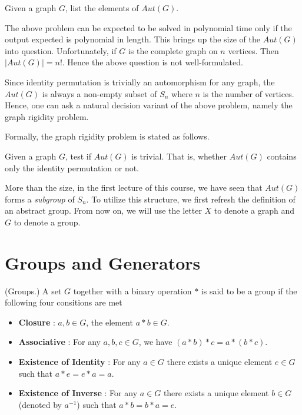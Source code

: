 \begin{problem}
Given a graph $G$, list the elements of $Aut(G)$.
\end{problem}

The above problem can be expected to be solved in polynomial time only if the output expected is polynomial in length. This brings up the size of the $Aut(G)$ into question. Unfortunately, if $G$ is the complete graph on $n$ vertices. Then $|Aut(G)|=n!$. Hence the above question is not well-formulated.

Since identity permutation is trivially an automorphism for any graph, the $Aut(G)$ is always a non-empty subset of $S_n$ where $n$ is the number of vertices. Hence, one can ask a natural decision variant of the above problem, namely the graph rigidity problem.

Formally, the graph rigidity problem is stated as follows.
\begin{problem}
Given a graph $G$, test if $Aut(G)$ is trivial. That is, whether $Aut(G)$ contains only the identity permutation or not.
\end{problem}

More than the size, in the first lecture of this course, we have seen that $Aut(G)$ forms a \textit{subgroup} of $S_n$. To utilize this structure, we first refresh the definition of an abstract group. From now on, we will use the letter $X$ to denote a graph and $G$ to denote a group. 


\section{Groups and Generators}

\begin{definition}(Groups.)
A set $G$ together with a binary operation $*$ is said to be a group if the following four consitions are met
\begin{itemize}
\item \textbf{Closure} : $a,b\in G$, the element $a*b\in G$.
\item \textbf{Associative} : For any $a,b,c\in G$, we have $(a*b)*c = a*(b*c)$.
\item \textbf{Existence of Identity} : For any $a\in G$ there exists a unique element $e\in G$ such that $a*e =e*a =a$. 
\item \textbf{Existence of Inverse} : For any $a\in G$ there exists a unique element $b\in G$(denoted by $a^{-1}$) such that $a*b =b*a =e$. 
\end{itemize}
\end{definition}

